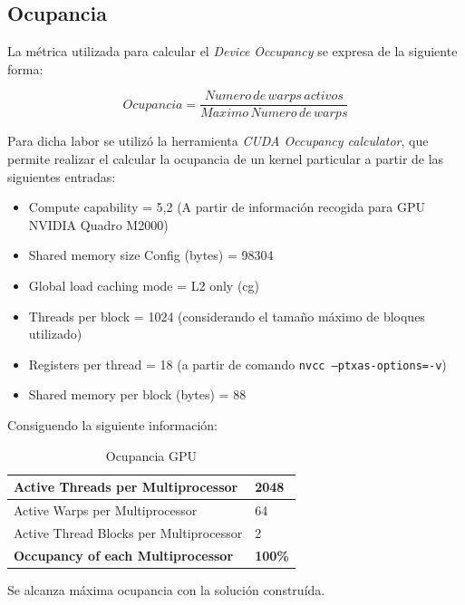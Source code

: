 \documentclass[jou]{apa6}
\begin{document}
\FloatBarrier

\subsection{Ocupancia}
La métrica utilizada para calcular el \textit{Device Occupancy} se expresa de la siguiente forma:

\[
	Ocupancia = \frac{Numero\, de\, warps\, activos}{Maximo\, Numero\, de\, warps}
\]

Para dicha labor se utilizó la herramienta \textit{CUDA Occupancy calculator}, que permite realizar el calcular la ocupancia de un kernel particular a partir de las siguientes entradas:

\begin{itemize}
	\item Compute capability = 5,2 (A partir de información recogida para GPU NVIDIA Quadro M2000)
	\item Shared memory size Config (bytes) = 98304
	\item Global load caching mode = L2 only (cg)
	\item Threads per block = 1024 (considerando el tamaño máximo de bloques utilizado)
	\item Registers per thread = 18 (a partir de comando \texttt{nvcc --ptxas-options=-v})
	\item Shared memory per block (bytes) = 88
\end{itemize}



Consiguendo la siguiente información:

\begin{table}[h]
	\centering
	\caption{Ocupancia GPU}
	\label{my-label}
	\begin{tabular}{@{}ll@{}}
		\toprule
		Active Threads per Multiprocessor         & 2048           \\ \midrule
		Active Warps per Multiprocessor           & 64             \\
		Active Thread Blocks per Multiprocessor   & 2              \\
		\textbf{Occupancy of each Multiprocessor} & \textbf{100\%} \\ \bottomrule
	\end{tabular}
\end{table}

Se alcanza máxima ocupancia con la solución construída.
\end{document}
